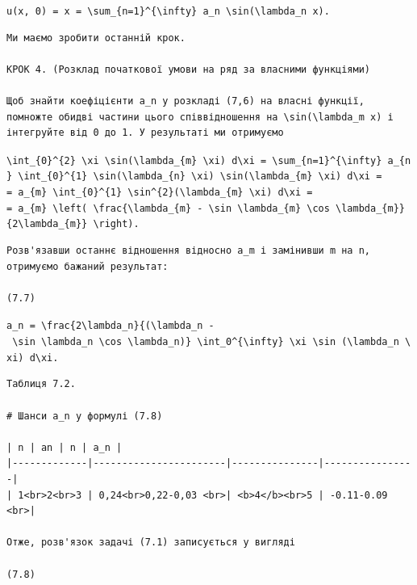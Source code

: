\documentclass[
  ukrainian,
]{article}
\begin{document}
\texttt{u(x,\ 0)\ =\ x\ =\ \textbackslash{}sum\_\{n=1\}\^{}\{\textbackslash{}infty\}\ a\_n\ \textbackslash{}sin(\textbackslash{}lambda\_n\ x).}

\begin{verbatim}
Ми маємо зробити останній крок.

КРОК 4. (Розклад початкової умови на ряд за власними функціями)

Щоб знайти коефіцієнти a_n у розкладі (7,6) на власні функції, помножте обидві частини цього співвідношення на \sin(\lambda_m x) і інтегруйте від 0 до 1. У результаті ми отримуємо
\end{verbatim}

\texttt{\textbackslash{}int\_\{0\}\^{}\{2\}\ \textbackslash{}xi\ \textbackslash{}sin(\textbackslash{}lambda\_\{m\}\ \textbackslash{}xi)\ d\textbackslash{}xi\ =\ \textbackslash{}sum\_\{n=1\}\^{}\{\textbackslash{}infty\}\ a\_\{n\}\ \textbackslash{}int\_\{0\}\^{}\{1\}\ \textbackslash{}sin(\textbackslash{}lambda\_\{n\}\ \textbackslash{}xi)\ \textbackslash{}sin(\textbackslash{}lambda\_\{m\}\ \textbackslash{}xi)\ d\textbackslash{}xi\ =}
\texttt{=\ a\_\{m\}\ \textbackslash{}int\_\{0\}\^{}\{1\}\ \textbackslash{}sin\^{}\{2\}(\textbackslash{}lambda\_\{m\}\ \textbackslash{}xi)\ d\textbackslash{}xi\ =}
\texttt{=\ a\_\{m\}\ \textbackslash{}left(\ \textbackslash{}frac\{\textbackslash{}lambda\_\{m\}\ -\ \textbackslash{}sin\ \textbackslash{}lambda\_\{m\}\ \textbackslash{}cos\ \textbackslash{}lambda\_\{m\}\}\{2\textbackslash{}lambda\_\{m\}\}\ \textbackslash{}right).}

\begin{verbatim}
Розв'язавши останнє відношення відносно a_m і замінивши m на n, отримуємо бажаний результат:

(7.7)
\end{verbatim}

\texttt{a\_n\ =\ \textbackslash{}frac\{2\textbackslash{}lambda\_n\}\{(\textbackslash{}lambda\_n\ -\ \textbackslash{}sin\ \textbackslash{}lambda\_n\ \textbackslash{}cos\ \textbackslash{}lambda\_n)\}\ \textbackslash{}int\_0\^{}\{\textbackslash{}infty\}\ \textbackslash{}xi\ \textbackslash{}sin\ (\textbackslash{}lambda\_n\ \textbackslash{}xi)\ d\textbackslash{}xi.}

\begin{verbatim}
Таблиця 7.2.

# Шанси a_n у формулі (7.8)

| n | an | n | a_n |
|-------------|-----------------------|---------------|----------------|
| 1<br>2<br>3 | 0,24<br>0,22-0,03 <br>| <b>4</b><br>5 | -0.11-0.09 <br>|

Отже, розв'язок задачі (7.1) записується у вигляді

(7.8)
\end{verbatim}
\end{document}
